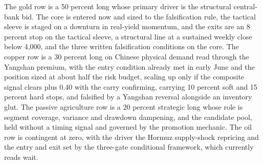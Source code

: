 \documentclass[11pt,a4paper]{article}
\begin{document}
The gold row is a 50 percent long whose primary driver is the structural central-bank bid. The core is entered now and sized to the falsification rule, the tactical sleeve is staged on a downturn in real-yield momentum, and the exits are an 8 percent stop on the tactical sleeve, a structural line at a sustained weekly close below 4,000, and the three written falsification conditions on the core. The copper row is a 30 percent long on Chinese physical demand read through the Yangshan premium, with the entry condition already met in early June and the position sized at about half the risk budget, scaling up only if the composite signal clears plus 0.40 with the carry confirming, carrying 10 percent soft and 15 percent hard stops, and falsified by a Yangshan reversal alongside an inventory glut. The passive agriculture row is a 20 percent strategic long whose role is segment coverage, variance and drawdown dampening, and the candidate pool, held without a timing signal and governed by the promotion mechanic. The oil row is contingent at zero, with the driver the Hormuz supply-shock repricing and the entry and exit set by the three-gate conditional framework, which currently reads wait.
\end{document}
